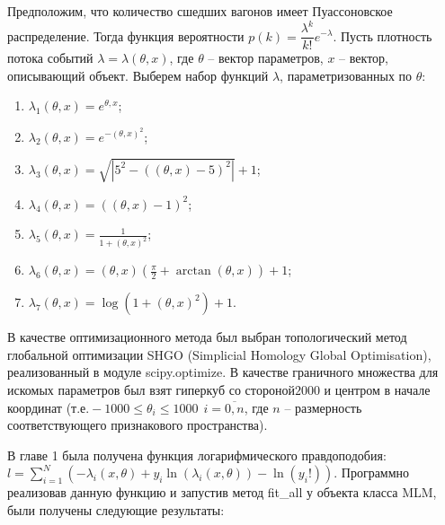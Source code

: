Предположим, что количество сшедших вагонов имеет Пуассоновское распределение. Тогда функция вероятности $p(k) = \dfrac{\lambda^k}{k!}e^{-\lambda}$. Пусть плотность потока событий $\lambda = \lambda(\theta, x)$, где $\theta$ -- вектор параметров, $x$ -- вектор, описывающий объект. Выберем набор функций $\lambda$, параметризованных по $\theta$:
\begin{enumerate}[label=\arabic*.]
    \item $\lambda_1(\theta, x) = e^{\theta, x}$;
    \item $\lambda_2(\theta, x) = e^{-(\theta, x)^2}$;
    \item $\lambda_3(\theta, x) = \sqrt{|5^2 - ((\theta, x) - 5)^2|} + 1$;
    \item $\lambda_4(\theta, x) = ((\theta, x) - 1)^2$;
    \item $\lambda_5(\theta, x) = \frac{1}{1 + (\theta, x)^2}$;
    \item $\lambda_6(\theta, x) = (\theta, x) (\frac{\pi}{2} + \arctan(\theta, x)) + 1$;
    \item $\lambda_7(\theta, x) = \log(1 + (\theta, x)^2) + 1$.
\end{enumerate}

В качестве оптимизационного метода был выбран топологический метод глобальной оптимизации SHGO (Simplicial Homology Global Optimisation), реализованный в модуле scipy.optimize. В качестве граничного множества для искомых параметров был взят гиперкуб со $стороной 2000$ и центром в начале координат (т.е$. -1000 \leq \theta_i \leq 1000~~i = \overline{0,n}$, где $n$ -- размерность соответствующего признакового пространства).

В главе 1 была получена функция логарифмического правдоподобия: $l = \sum\limits_{i=1}^{N} \left( -\lambda_i(x, \theta) + y_i \ln(\lambda_i(x, \theta)) - \ln(y_i!) \right)$. Программно реализовав данную функцию и запустив метод fit\_all у объекта класса MLM, были получены следующие результаты:

